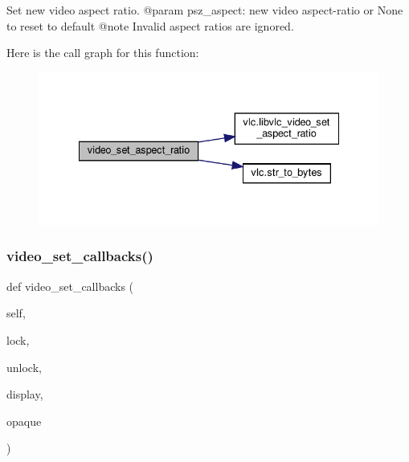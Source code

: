 \begin{DoxyVerb}Set new video aspect ratio.
@param psz_aspect: new video aspect-ratio or None to reset to default @note Invalid aspect ratios are ignored.
\end{DoxyVerb}
 Here is the call graph for this function\+:
\nopagebreak
\begin{figure}[H]
\begin{center}
\leavevmode
\includegraphics[width=335pt]{classvlc_1_1_media_player_af2cb8a29a559902d75d2b58dcad3e938_cgraph}
\end{center}
\end{figure}
\mbox{\label{classvlc_1_1_media_player_a403510f3a743d0f553a5eaf83db7a0dc}} 
\subsubsection{\texorpdfstring{video\+\_\+set\+\_\+callbacks()}{video\_set\_callbacks()}}
{\footnotesize\ttfamily def video\+\_\+set\+\_\+callbacks (\begin{DoxyParamCaption}\item[{}]{self,  }\item[{}]{lock,  }\item[{}]{unlock,  }\item[{}]{display,  }\item[{}]{opaque }\end{DoxyParamCaption})}

